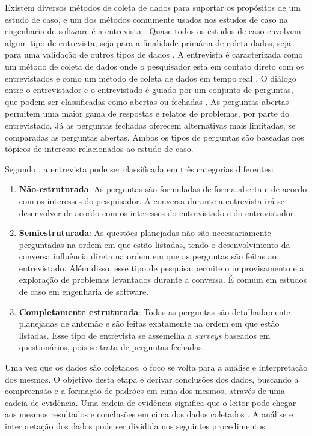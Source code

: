 Existem diversos métodos de coleta de dados para suportar os propósitos de um estudo de caso, e um dos métodos comumente usados nos estudos de caso na engenharia de software é a entrevista \cite{caseStudySE}. Quase todos os estudos de caso envolvem algum tipo de entrevista, seja para a finalidade primária de coleta dados, seja para uma validação de outros tipos de dados \cite{caseStudySE}. A entrevista é caracterizada como um método de coleta de dados onde o pesquisador está em contato direto com os entrevistados e como um método de coleta de dados em tempo real \cite{caseStudySE}. O diálogo entre o entrevistador e o entrevistado é guiado por um conjunto de perguntas, que podem ser classificadas como abertas ou fechadas \cite{caseStudySE}. As perguntas abertas permitem uma maior gama de respostas e relatos de problemas, por parte do entrevistado. Já as perguntas fechadas oferecem alternativas mais limitadas, se comparadas as perguntas abertas. Ambos os tipos de perguntas são baseadas nos tópicos de interesse relacionados ao estudo de caso. 

Segundo \cite{caseStudySE}, a entrevista pode ser classificada em três categorias diferentes:
\begin{enumerate}
	\item \textbf{Não-estruturada}: As perguntas são formuladas de forma aberta e de acordo com os interesses do pesquisador. A conversa durante a entrevista irá se desenvolver de acordo com os interesses do entrevistado e do entrevistador.
	\item \textbf{Semiestruturada}: As questões planejadas não são necessariamente perguntadas na ordem em que estão listadas, tendo o desenvolvimento da conversa influência direta na ordem em que as perguntas são feitas ao entrevistado. Além disso, esse tipo de pesquisa permite o improvisamento e a exploração de problemas levantados durante a conversa. É comum em estudos de caso em engenharia de software.
	\item \textbf{Completamente estruturada}: Todas as perguntas são detalhadamente planejadas de antemão e são feitas exatamente na ordem em que estão listadas. Esse tipo de entrevista se assemelha a \textit{surveys} baseados em questionários, pois se trata de perguntas fechadas.
\end{enumerate}

Uma vez que os dados são coletados, o foco se volta para a análise e interpretação dos mesmos. O objetivo desta etapa é derivar conclusões dos dados, buscando a compreensão e a formação de padrões em cima dos mesmos, através de uma cadeia de evidência. Uma cadeia de evidência significa que o leitor pode chegar aos mesmos resultados e conclusões em cima dos dados coletados \cite{caseStudySE}. A análise e interpretação dos dados pode ser dividida nos seguintes procedimentos \cite{caseStudySE}:


